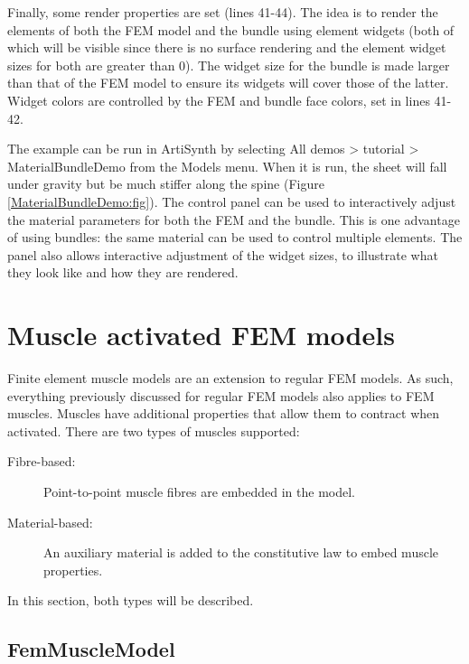 Finally, some render properties are set (lines 41-44). The idea is to
render the elements of both the FEM model and the bundle using element
widgets (both of which will be visible since there is no surface
rendering and the element widget sizes for both are greater than 0).
The widget size for the bundle is made larger than that of the FEM
model to ensure its widgets will cover those of the latter. Widget
colors are controlled by the FEM and bundle face colors, set in lines
41-42.

The example can be run in ArtiSynth by selecting {\sf All demos >
tutorial > MaterialBundleDemo} from the {\sf Models} menu.  When it is
run, the sheet will fall under gravity but be much stiffer along the
spine (Figure \ref{MaterialBundleDemo:fig}). The control panel can be
used to interactively adjust the material parameters for both the FEM
and the bundle. This is one advantage of using bundles: the same
material can be used to control multiple elements. The panel also
allows interactive adjustment of the widget sizes, to illustrate what
they look like and how they are rendered.

\section{Muscle activated FEM models}
\label{sec:fem:muscle}

Finite element muscle models are an extension to regular FEM models.  As such,
everything previously discussed for regular FEM models also applies to FEM
muscles.  Muscles have additional properties that allow them to contract when 
activated.  There are two types of muscles supported:
\begin{description}
\item[Fibre-based:] Point-to-point muscle fibres are embedded in the model.
\item[Material-based:] An auxiliary material is added to the constitutive law
    to embed muscle properties. 
\end{description}
In this section, both types will be described.

\subsection{FemMuscleModel}
\label{FemMuscleModel:sec}

